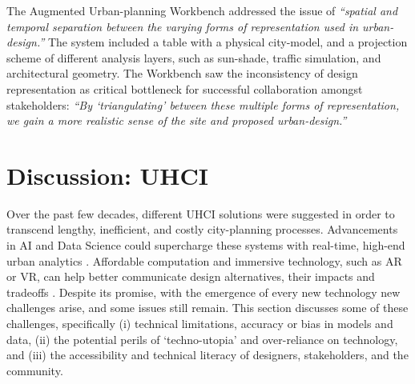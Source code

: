 {{        The Augmented Urban-planning Workbench \cite{ben-joseph2001} addressed the issue of \textit{``spatial and temporal separation between the varying forms of representation used in urban-design.''} The system included a table with a physical city-model, and a projection scheme of different analysis layers, such as sun-shade, traffic simulation, and architectural geometry. The Workbench saw the inconsistency of design representation as critical bottleneck for successful collaboration amongst stakeholders: \textit{``By `triangulating' between these multiple forms of representation, we gain a more realistic sense of the site and proposed urban-design.''} \cite{ben-joseph2001}
    }

    \section{Discussion: UHCI}
     {
      Over the past few decades, different UHCI solutions were suggested in order to transcend lengthy, inefficient, and costly city-planning processes. Advancements in AI and Data Science could supercharge these systems with real-time, high-end urban analytics \cite{Batty2013, Kitchin2014}. Affordable computation and immersive technology, such as AR or VR, can help better communicate design alternatives, their impacts and tradeoffs \cite{shakeri2017use,banerjee2011companion}.
      \newline
      Despite its promise, with the emergence of every new technology new challenges arise, and some issues still remain. This section discusses some of these challenges, specifically (i) technical limitations, accuracy or bias in models and data, (ii) the potential perils of `techno-utopia' and over-reliance on technology, and (iii) the accessibility and technical literacy of designers, stakeholders, and the community.


}}
